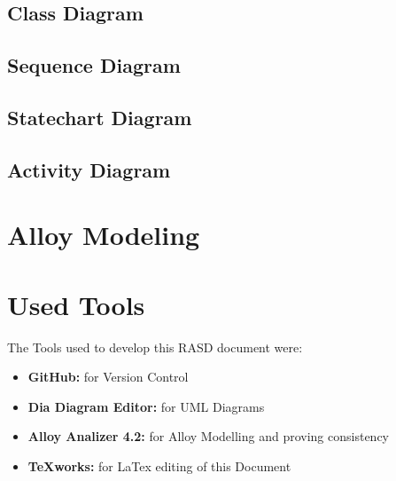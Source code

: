 \documentclass[a4paper]{article}
\begin{document}
\subsection{Class Diagram}
\subsection{Sequence Diagram}
\subsection{Statechart Diagram}
\subsection{Activity Diagram}
\section{Alloy Modeling}
\newpage

\section{Used Tools}
The Tools used to develop this RASD document were:
\begin{itemize}
	\item \textbf{GitHub:} for Version Control
	\item \textbf {Dia Diagram Editor:} for UML Diagrams
	\item \textbf{Alloy Analizer 4.2:} for Alloy Modelling and proving consistency 
	\item \textbf {TeXworks:} for LaTex editing of this Document
\end{itemize}
\newpage
\end{document}
